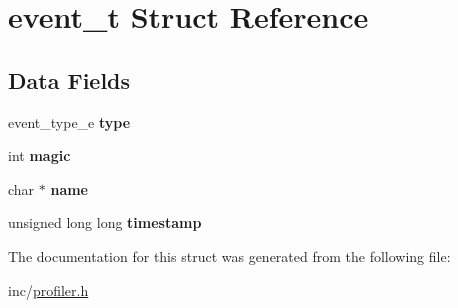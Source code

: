 \hypertarget{structevent__t}{}\section{event\+\_\+t Struct Reference}
\label{structevent__t}
\subsection*{Data Fields}
\begin{DoxyCompactItemize}
\item 
event\+\_\+type\+\_\+e {\bfseries type}\hypertarget{structevent__t_a9de80e7379b7765ce1be94f1afdbe299}{}\label{structevent__t_a9de80e7379b7765ce1be94f1afdbe299}

\item 
int {\bfseries magic}\hypertarget{structevent__t_a49228cb7c7840507a14a62231e262ed0}{}\label{structevent__t_a49228cb7c7840507a14a62231e262ed0}

\item 
char $\ast$ {\bfseries name}\hypertarget{structevent__t_a5e267e72cb1799268e9333ed5f05dd85}{}\label{structevent__t_a5e267e72cb1799268e9333ed5f05dd85}

\item 
unsigned long long {\bfseries timestamp}\hypertarget{structevent__t_a0597eb180983129aeddc1033f122b5ce}{}\label{structevent__t_a0597eb180983129aeddc1033f122b5ce}

\end{DoxyCompactItemize}


The documentation for this struct was generated from the following file\+:\begin{DoxyCompactItemize}
\item 
inc/\hyperlink{profiler_8h}{profiler.\+h}\end{DoxyCompactItemize}
